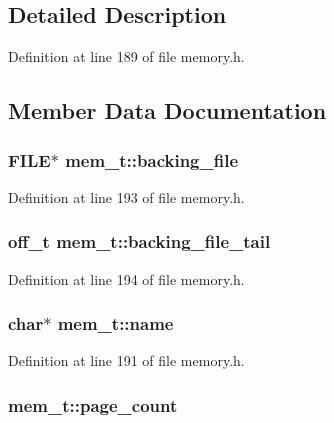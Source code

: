 \subsection{Detailed Description}


Definition at line 189 of file memory.h.

\subsection{Member Data Documentation}
\subsubsection[{backing\_\-file}]{\setlength{\rightskip}{0pt plus 5cm}FILE$\ast$ {\bf mem\_\-t::backing\_\-file}}\label{structmem__t_5fa11307a05160d86e5624f4a07d647d}




Definition at line 193 of file memory.h.
\subsubsection[{backing\_\-file\_\-tail}]{\setlength{\rightskip}{0pt plus 5cm}off\_\-t {\bf mem\_\-t::backing\_\-file\_\-tail}}\label{structmem__t_0902ecaea48c0e65348064f02fd2eded}




Definition at line 194 of file memory.h.
\subsubsection[{name}]{\setlength{\rightskip}{0pt plus 5cm}char$\ast$ {\bf mem\_\-t::name}}\label{structmem__t_8de77b92c23a31647d3591391c4fd816}




Definition at line 191 of file memory.h.
\subsubsection[{page\_\-count}]{ {\bf mem\_\-t::page\_\-count}}\label{structmem__t_b3d6476078e09298d0c5033930db2808}




